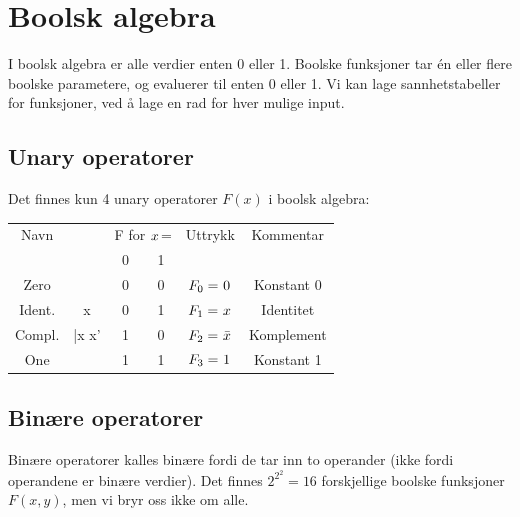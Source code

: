\documentclass[12pt,a4paper,norsk]{article}
\begin{document}
\newcommand{\varkern}{\hspace{0.06em}}
\newcommand{\var}[1]{\varkern#1\varkern}
\newcommand{\kom}[1]{\varkern\bar{#1}\varkern}
\newcommand{\xor}{\oplus}
\newcommand{\xnor}{\odot}

\section{Boolsk algebra}\label{sec:bool_alg}
I boolsk algebra er alle verdier enten 0 eller 1. Boolske funksjoner tar én
eller flere boolske parametere, og evaluerer til enten 0 eller 1. Vi kan lage
sannhetstabeller for funksjoner, ved å lage en rad for hver mulige input.

\subsection{Unary operatorer}
Det finnes kun 4 unary operatorer $F(x)$ i boolsk algebra:
\begin{table}[H]
\centering
\begin{tabular}{ |c|C|C|C|c|c| }
  \toprule
  Navn &  & \multicolumn{2}{|c|}{F for $\var{x}$=} & Uttrykk & Kommentar \\
  & & 0 & 1 & & \\
  \midrule
  Zero & & 0 & 0 & $F_{0} = \var{0}$ & Konstant 0 \\
  Ident. & \var{x} & 0 & 1 & $F_{1} = \var{x}$ & Identitet \\
  Compl. & \kom{x} \text{/} \var{x'} & 1 & 0 & $F_{2} = \kom{x}$ & Komplement \\
  One & & 1 & 1 & $F_{3} = \var{1}$ & Konstant 1 \\
  \bottomrule
\end{tabular}
\end{table}

\subsection{Binære operatorer}
Binære operatorer kalles binære fordi de tar inn to operander (ikke fordi
operandene er binære verdier). Det finnes $2^{2^{2}} = 16$ forskjellige boolske
funksjoner $F(x,y)$, men vi bryr oss ikke om alle.
\end{document}

